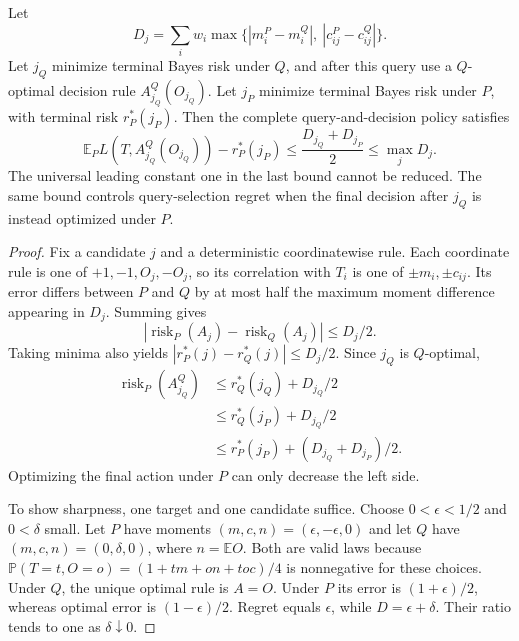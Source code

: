 \begin{theorem}
\label{thm:terminal-transfer-r3}
Let
\[
 D_j=\sum_i w_i
 \max\{|m_i^P-m_i^Q|,\ |c_{ij}^P-c_{ij}^Q|\}.
\]
Let $j_Q$ minimize terminal Bayes risk under $Q$, and after this query
use a $Q$-optimal decision rule $A^Q_{j_Q}(O_{j_Q})$.
Let $j_P$ minimize terminal Bayes risk under $P$, with terminal risk
$r_P^*(j_P)$. Then the complete query-and-decision policy satisfies
\[
 \mathbb{E}_P L(T,A^Q_{j_Q}(O_{j_Q}))-r_P^*(j_P)
 \le \frac{D_{j_Q}+D_{j_P}}{2}
 \le \max_j D_j.
\]
The universal leading constant one in the last bound cannot be reduced.
The same bound controls query-selection regret when the final decision
after $j_Q$ is instead optimized under $P$.
\end{theorem}
\begin{proof}
Fix a candidate $j$ and a deterministic coordinatewise rule.
Each coordinate rule is one of $+1,-1,O_j,-O_j$, so its correlation
with $T_i$ is one of $\pm m_i,\pm c_{ij}$.
Its error differs between $P$ and $Q$ by at most half the maximum
moment difference appearing in $D_j$. Summing gives
\[
 |\operatorname{risk}_P(A_j)-\operatorname{risk}_Q(A_j)|
 \le D_j/2.
\]
Taking minima also yields $|r_P^*(j)-r_Q^*(j)|\le D_j/2$.
Since $j_Q$ is $Q$-optimal,
\begin{align*}
 \operatorname{risk}_P(A^Q_{j_Q})
 &\le r_Q^*(j_Q)+D_{j_Q}/2\\
 &\le r_Q^*(j_P)+D_{j_Q}/2\\
 &\le r_P^*(j_P)+(D_{j_Q}+D_{j_P})/2.
\end{align*}
Optimizing the final action under $P$ can only decrease the left side.

To show sharpness, one target and one candidate suffice.
Choose $0<\epsilon<1/2$ and $0<\delta$ small.
Let $P$ have moments $(m,c,n)=(\epsilon,-\epsilon,0)$ and let $Q$
have $(m,c,n)=(0,\delta,0)$, where $n=\mathbb{E}O$.
Both are valid laws because
$\mathbb{P}(T=t,O=o)=(1+tm+on+toc)/4$ is nonnegative for these choices.
Under $Q$, the unique optimal rule is $A=O$.
Under $P$ its error is $(1+\epsilon)/2$, whereas optimal error is
$(1-\epsilon)/2$. Regret equals $\epsilon$, while
$D=\epsilon+\delta$. Their ratio tends to one as $\delta\downarrow0$.
\end{proof}

